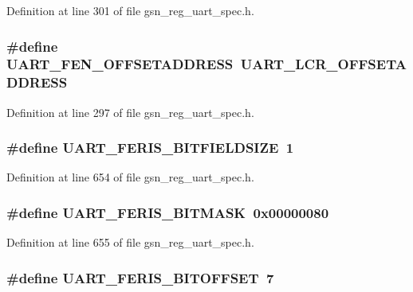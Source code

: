 Definition at line 301 of file gsn\_\-reg\_\-uart\_\-spec.h.

\hypertarget{a00575_afe672cd947a3bce438b8e5931f7016ef}{
\subsubsection[{UART\_\-FEN\_\-OFFSETADDRESS}]{\setlength{\rightskip}{0pt plus 5cm}\#define UART\_\-FEN\_\-OFFSETADDRESS~UART\_\-LCR\_\-OFFSETADDRESS}}
\label{a00575_afe672cd947a3bce438b8e5931f7016ef}


Definition at line 297 of file gsn\_\-reg\_\-uart\_\-spec.h.

\hypertarget{a00575_a801ff0570fa8a0cf47846a2e72153f55}{
\subsubsection[{UART\_\-FERIS\_\-BITFIELDSIZE}]{\setlength{\rightskip}{0pt plus 5cm}\#define UART\_\-FERIS\_\-BITFIELDSIZE~1}}
\label{a00575_a801ff0570fa8a0cf47846a2e72153f55}


Definition at line 654 of file gsn\_\-reg\_\-uart\_\-spec.h.

\hypertarget{a00575_a9f24b73a79bfdd8268f04bf8ca8893cc}{
\subsubsection[{UART\_\-FERIS\_\-BITMASK}]{\setlength{\rightskip}{0pt plus 5cm}\#define UART\_\-FERIS\_\-BITMASK~0x00000080}}
\label{a00575_a9f24b73a79bfdd8268f04bf8ca8893cc}


Definition at line 655 of file gsn\_\-reg\_\-uart\_\-spec.h.

\hypertarget{a00575_aa86e82529d5609dfdc6410248a01a8f3}{
\subsubsection[{UART\_\-FERIS\_\-BITOFFSET}]{\setlength{\rightskip}{0pt plus 5cm}\#define UART\_\-FERIS\_\-BITOFFSET~7}}
\label{a00575_aa86e82529d5609dfdc6410248a01a8f3}


